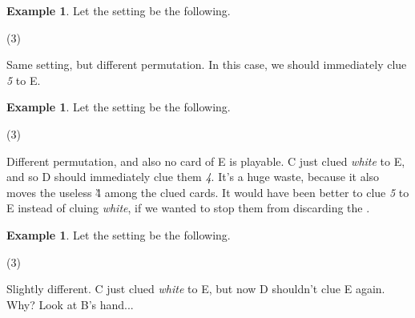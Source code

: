 \documentclass[a4paper]{article}
\theoremstyle{plain}
\theoremstyle{definition}
\newtheorem{example}[theorem]{Example}
\begin{document}
\begin{example}
	
	Let the setting be the following.
	
	\begin{tasks}(3)
		\task[+]      
		\task[A]    
		\task[B]    
		\task[C]    
		\task[D]    
		\task[E]    
	\end{tasks}
	
	Same setting, but different permutation. In this case, we should immediately clue \textit{5} to E.
	
\end{example}

\begin{example}
	
	Let the setting be the following.
	
	\begin{tasks}(3)
		\task[+]      
		\task[A]    
		\task[B]    
		\task[C]    
		\task[D]    
		\task[E]    
	\end{tasks}
	
	Different permutation, and also no card of E is playable. C just clued \textit{white} to E, and so D should immediately clue them \textit{4}. It's a huge waste, because it also moves the useless \G{4} among the clued cards. It would have been better to clue \textit{5} to E instead of cluing \textit{white}, if we wanted to stop them from discarding the .
	
\end{example}

\begin{example}
	
	Let the setting be the following.
	
	\begin{tasks}(3)
		\task[+]      
		\task[A]    
		\task[B]    
		\task[C]    
		\task[D]    
		\task[E]    
	\end{tasks}
	
	Slightly different. C just clued \textit{white} to E, but now D shouldn't clue E again. Why? Look at B's hand...
	
\end{example}
\end{document}
